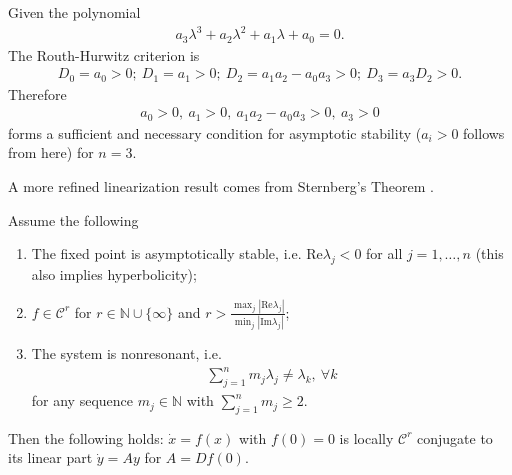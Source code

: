 \begin{ex}
	Given the polynomial
	\begin{align}
		a_3 \lambda ^3 + a_2 \lambda^2 + a_1 \lambda + a_0 = 0.
	\end{align}
	The Routh-Hurwitz criterion is
	\begin{align}
	D_0 = a_0 > 0;\ D_1 = a_1 >0;\ D_2 = a_1 a_2 - a_0 a_3>0;\ D_3 = a_3 D_2 >0.	
	\end{align}
	Therefore 
	\begin{align}
		\boxed{
			a_0> 0,\ a_1 > 0,\ a_1a_2 - a_0a_3 > 0,\ a_3 > 0
		}
	\end{align}
	forms a sufficient and necessary condition for asymptotic stability ($a_i >0$ follows from here) for $n=3$.
\end{ex}

A more refined linearization result comes from Sternberg's Theorem \cite{Chicone}.
\begin{theorem}[Sternberg]
Assume the following
\begin{enumerate}
	\item The fixed point is asymptotically stable, i.e. $ \textrm{Re} \lambda _j<0$ for all $j=1,\ldots,n$ (this also implies hyperbolicity);
	\item $f\in \mathcal{C}^{r}$ for $r\in \mathbb{N}\cup \{\infty \}$ and $r>\frac{\max_{j}| \textrm{Re} \lambda _j|}{\min_{j}| \textrm{Im} \lambda _j|}$;
	\item The system is nonresonant, i.e. 
		\begin{align}
			\sum_{j=1}^{n}m_j \lambda _j \neq \lambda_k,\ \forall k
		\end{align}
	for any sequence $m_j \in \mathbb{N}$ with $\sum_{j=1}^{n} m_j \geq 2$.
	
\end{enumerate}
Then the following holds: $\dot{x}=f(x)$ with $f(0)=0$ is locally $\mathcal{C}^{r}$ conjugate to its linear part $\dot{y}=Ay$ for $A= Df(0)$.
\end{theorem}


